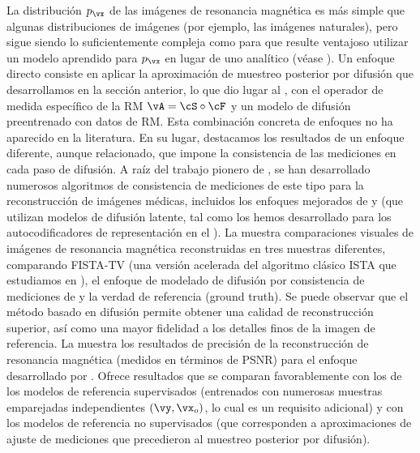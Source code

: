 \documentclass[../../book-main_es.tex]{subfiles}
\begin{document}
La distribución
$p_{\vx}$ de las imágenes de resonancia magnética es más simple que algunas distribuciones de imágenes (por ejemplo, las imágenes naturales),
pero sigue siendo lo suficientemente compleja como para que resulte ventajoso utilizar un modelo aprendido
para $p_{\vx}$ en lugar de uno analítico (véase \cite{Wright-Ma-2022}).
Un enfoque directo consiste en aplicar la aproximación de muestreo posterior por difusión
que desarrollamos en la sección anterior, lo que dio lugar al
, con el operador de medida específico de la RM
$\vA = \cS \circ \cF$ y un modelo de difusión preentrenado con
datos de RM.
Esta combinación concreta de enfoques no ha aparecido en la literatura.
En su lugar, destacamos los resultados de un enfoque diferente, aunque relacionado, que
impone la consistencia de las mediciones en cada paso de difusión.
A raíz del trabajo pionero de \textcite{song2022solving}, se han
desarrollado numerosos
algoritmos de consistencia de mediciones de este tipo para la reconstrucción de imágenes médicas,
incluidos los enfoques mejorados de \textcite{song2024solving} y
\textcite{rout2023solving} (que utilizan modelos de difusión latente, tal como los hemos
    desarrollado para los autocodificadores de representación en el
).
La  muestra comparaciones visuales de imágenes de
resonancia magnética reconstruidas en tres muestras diferentes, comparando FISTA-TV (una versión 
    acelerada del algoritmo clásico ISTA que estudiamos en
),
el enfoque de modelado de difusión por consistencia de mediciones de
\textcite{song2022solving} y la verdad de referencia (ground truth). Se puede observar que el método basado en difusión
permite obtener una calidad de reconstrucción superior, así como
una mayor fidelidad a los detalles finos de la imagen de referencia.
La  muestra los resultados de precisión de la reconstrucción de resonancia magnética
(medidos en términos de PSNR)
para el enfoque desarrollado por \textcite{song2022solving}. Ofrece resultados que se comparan favorablemente con los de
los modelos de referencia supervisados (entrenados con numerosas muestras emparejadas independientes $(\vy,
\vx_o)$, lo cual es un requisito adicional) y con los modelos de referencia no supervisados (que
    corresponden a aproximaciones de ajuste de mediciones que precedieron al muestreo
posterior por difusión).
\end{document}
